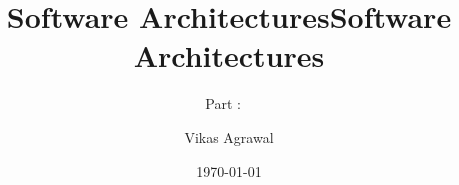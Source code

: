 

\ifoverview
\title[Software Architectures - \partTitle \ (Version \partVersion)]{Software Architectures}

\subtitle[\partTitle]{\partTitle}

\else

\title[Software Architectures - Part \partNo :\ \partTitle \ (Version \partVersion)]{Software Architectures}

\subtitle[Part  \partNo :\  \partTitle]{Part \partNo : \  \partTitle}

\fi

\author[Vikas Agrawal]{Vikas Agrawal}%


\ifpartII
{}
\fi


\date[\copyright{} 2015]{\today}






